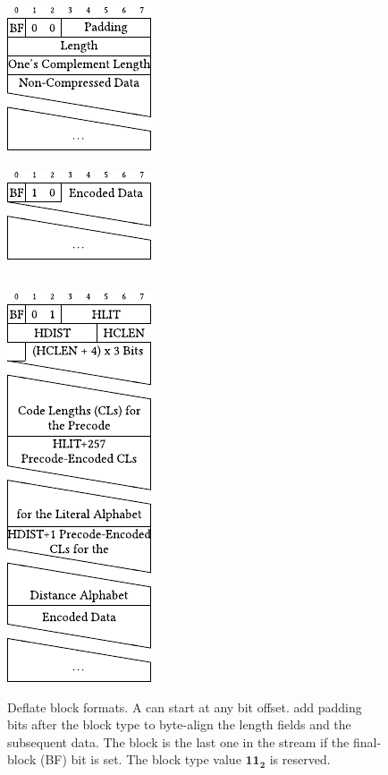 \begin{figure}
    \centering
    \begin{minipage}{0.49\linewidth}\begin{center}
        \textbf{\rawblock}\\[8pt]
        \includegraphics[scale=1]{figures/non-compressed-deflate-block.pdf}\\[8pt]
        \textbf{\fixedblock}\\[10pt]
        \includegraphics[scale=1]{figures/fixed-huffman-coding-deflate-block.pdf}
    \end{center}\end{minipage}\begin{minipage}{0.49\linewidth}\begin{center}
        \textbf{\dynblock}\\[8pt]
        \includegraphics[scale=1]{figures/dynamic-huffman-coding-deflate-block.pdf}
    \end{center}\end{minipage}
    \caption{
        Deflate block formats.
        A  can start at any bit offset.
        \rawblocks add padding bits after the block type to byte-align the length fields and the subsequent data.
        The block is the last one in the  stream if the final-block (BF) bit is set.
        The block type value $\mathbf{{11}_2}$ is reserved.
    }
    \label{fig:deflate_blocks}
\end{figure}

